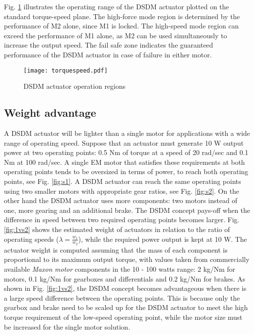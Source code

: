 Fig. \ref{fig:torquespeed} illustrates the operating range of the DSDM actuator plotted on the standard torque-speed plane. The high-force mode region is determined by the performance of M2 alone, since M1 is locked. The high-speed mode region can exceed the performance of M1 alone, as M2 can be used simultaneously to increase the output speed. The fail safe zone indicates the guaranteed performance of the DSDM actuator in case of failure in either motor. 

\begin{figure}[H]
	\centering
		\texttt{[image: torquespeed.pdf]}
	\caption[DSDM actuator operation region]{DSDM actuator operation regions}
	\label{fig:torquespeed}
\end{figure}

\subsection{Weight advantage}
\label{sec:WeightAdvantage}


A DSDM actuator will be lighter than a single motor for applications with a wide range of operating speed. Suppose that an actuator must generate 10 W output power at two operating points: 0.5 Nm of torque at a speed of 20 rad/sec and 0.1 Nm at 100 rad/sec. A single EM motor that satisfies these requirements at both operating points tends to be oversized in terms of power, to reach both operating points, see Fig. \ref{fig:s1}. A DSDM actuator can reach the same operating points using two smaller motors with appropriate gear ratios, see Fig. \ref{fig:s2}. On the other hand the DSDM actuator uses more components: two motors instead of one, more gearing and an additional brake. The DSDM concept pays-off when the difference in speed between two required operating points becomes larger.  Fig. \ref{fig:1vs2} shows the estimated weight of actuators in relation to the ratio of operating speeds ($\lambda=\frac{w_1}{w_2}$), while the required power output is kept at 10 W. The actuator weight is computed assuming that the mass of each component is proportional to its maximum output torque, with values taken from commercially available \textit{Maxon motor} components in the 10 - 100 watts range: 2 kg/Nm for motors, 0.1 kg/Nm for gearboxes and differentials and 0.2 kg/Nm for brakes. As shown in Fig. \ref{fig:1vs2}, the DSDM concept becomes advantageous when there is a large speed difference between the operating points. This is because only the gearbox and brake need to be scaled up for the DSDM actuator to meet the high torque requirement of the low-speed operating point, while the motor size must be increased for the single motor solution.

